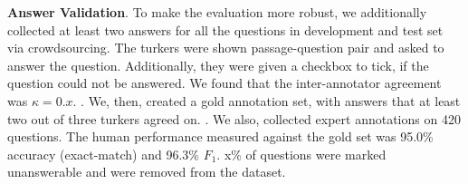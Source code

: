 \textbf{Answer Validation}. 
To make the evaluation more robust, we additionally collected at least two answers for all the questions in development and test set via crowdsourcing. The turkers were shown passage-question pair and asked to answer the question. Additionally, they were given a checkbox to tick, if the question could not be answered. We found that the inter-annotator agreement was $\kappa=0.x$. . We, then, created a gold annotation set, with answers that at least two out of three turkers agreed on. . We also, collected expert annotations on 420 questions. The human performance measured against the gold set was 95.0\% accuracy (exact-match) and 96.3\% $F_1$. x\% of questions were marked unanswerable and were removed from the dataset.



